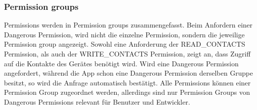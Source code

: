 \documentclass[FIPLY_base.tex]{subfiles}
\begin{document}
\subsubsection{Permission groups}
Permissions werden in Permission groups zusammengefasst.
Beim Anfordern einer Dangerous Permission, wird nicht die einzelne Permission, sondern die jeweilige Permission group angezeigt.
Sowohl eine Anforderung der READ\_CONTACTS Permission, als auch der WRITE\_CONTACTS Permission, zeigt an, dass Zugriff auf die Kontakte des Gerätes benötigt wird. Wird eine Dangerous Permission angefordert, während die App schon eine Dangerous Permission derselben Gruppe besitzt, so wird die Anfrage automatisch bestätigt.
Alle Permissions können einer Permission Group zugeordnet werden, allerdings sind nur Permission Groups von Dangerous Permissions relevant für Benutzer und Entwickler.
\end{document}
